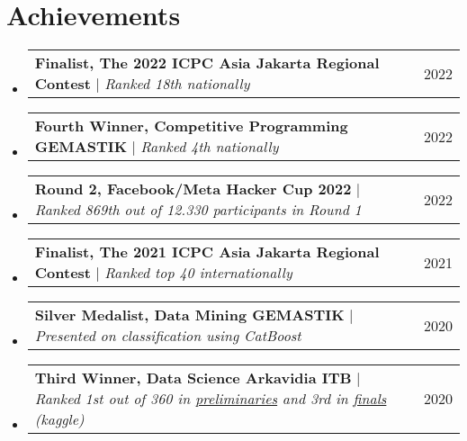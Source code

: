 \documentclass[letterpaper,11pt]{article}
\makeatletter
\newcommand{\resumeProjectHeading}[2]{
    \item
    \begin{tabular*}{\textwidth}{l@{\extracolsep{\fill}}r}
      \small#1 & #2 \\
    \end{tabular*}\vspace{-7pt}
}
\newcommand{\resumeSubHeadingListStart}{\begin{itemize}[leftmargin=0in, label={}]}
\newcommand{\resumeSubHeadingListEnd}{\end{itemize}}
\makeatother
\begin{document}
\section{Achievements}
    \resumeSubHeadingListStart
    \resumeProjectHeading
          {\textbf{Finalist, The 2022 ICPC Asia Jakarta Regional Contest}
          $|$ \emph{Ranked 18th nationally}}{2022}
    \resumeProjectHeading
          {\textbf{Fourth Winner, Competitive Programming GEMASTIK}
          $|$ \emph{Ranked 4th nationally}}{2022}
      \resumeProjectHeading
          {\textbf{Round 2, Facebook/Meta Hacker Cup 2022}
          $|$ \emph{Ranked 869th out of 12.330 participants in Round 1}}{2022}
    \resumeProjectHeading
          {\textbf{Finalist, The 2021 ICPC Asia Jakarta Regional Contest}
          $|$ \emph{Ranked top 40 internationally}}{2021}
      \resumeProjectHeading
          {\textbf{Silver Medalist, Data Mining GEMASTIK}
          $|$ \emph{Presented on classification using CatBoost}}{2020}
      \resumeProjectHeading
          {\textbf{Third Winner, Data Science Arkavidia ITB}
          $|$ \emph{Ranked 1st out of 360 in \href{https://www.kaggle.com/c/datavidia2019v2/leaderboard}{preliminaries} and 3rd in \href{https://www.kaggle.com/c/finaldatavidia2019/leaderboard}{finals} (kaggle)}}{2020}
    \resumeSubHeadingListEnd

\end{document}
